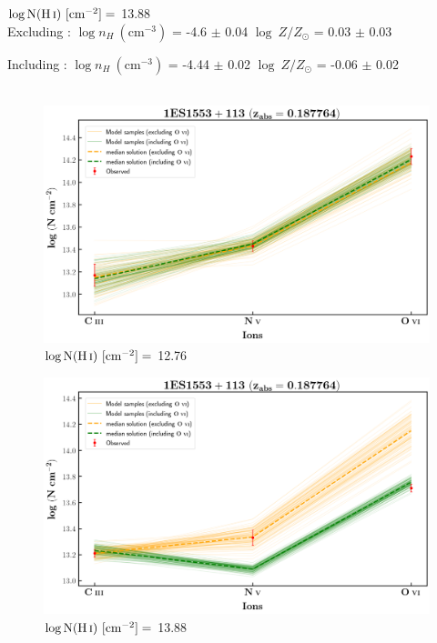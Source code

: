   $\log \text{N}(\ion{H}{i}) \ [\text{cm}^{-2}]=$ 13.88 \\
  
  Excluding  : $\log n_H \ (\text{cm}^{-3})$ = -4.6 $\pm$ 0.04 \hspace{10mm} $\log \ Z/Z_\odot$ = 0.03 $\pm$ 0.03
  
  Including  : $\log n_H \ (\text{cm}^{-3})$ = -4.44 $\pm$ 0.02 \hspace{10mm} $\log \ Z/Z_\odot$ = -0.06 $\pm$ 0.02
  \\\\
  
  
  \newpage
  
  
  \begin{figure}[!h]
      \centering
      \includegraphics[width=0.85\linewidth]{Ionisation-Modelling-Plots/1es1553-z=0.187764-compI.png}
      \caption{$\log \text{N}(\ion{H}{i}) \ [\text{cm}^{-2}]=$ 12.76}
  \end{figure}
  
  \begin{figure}[!b]
      \centering
      \includegraphics[width=0.85\linewidth]{Ionisation-Modelling-Plots/1es1553-z=0.187764-compII.png}
      \caption{$\log \text{N}(\ion{H}{i}) \ [\text{cm}^{-2}]=$ 13.88}
  \end{figure}
  
